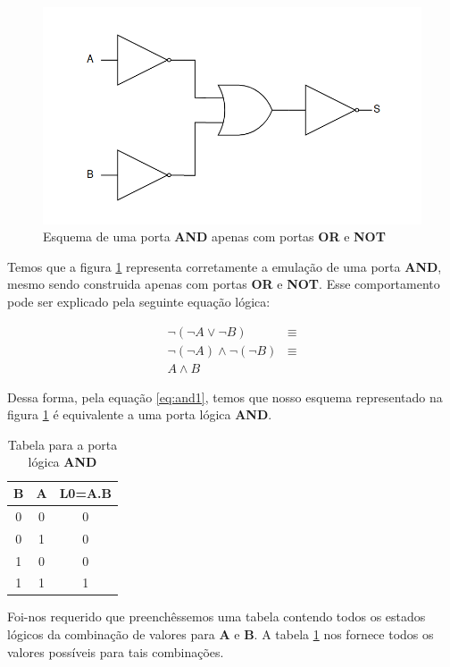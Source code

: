 \documentclass[12pt]{article}
\begin{document}
\begin{figure}[H]
    \centering
    \includegraphics[width=.9\textwidth]{exp1_2.3_f1.png}
    \caption{Esquema de uma porta \textbf{AND} apenas com portas \textbf{OR} e \textbf{NOT}}
    \label{fig:exp1_2.3_f1}
\end{figure}

Temos que a figura \ref{fig:exp1_2.3_f1} representa corretamente a emulação de
uma porta \textbf{AND}, mesmo sendo construida apenas com portas \textbf{OR} e
\textbf{NOT}. Esse comportamento pode ser explicado pela seguinte equação
lógica:

\begin{align}
\lnot (\lnot A \lor \lnot B) &\equiv \\
\lnot (\lnot A) \land \lnot (\lnot B) &\equiv \\
A \land B \label{eq:and1}
\end{align}

Dessa forma, pela equação \ref{eq:and1}, temos que nosso esquema representado na figura
\ref{fig:exp1_2.3_f1} é equivalente a uma porta lógica \textbf{AND}.

\begin{table}[H]
    \centering
    \caption{Tabela para a porta lógica \textbf{AND}}
    \begin{tabular}{|c|c|c|}
    \hline
    \textbf{B} & \textbf{A} & \textbf{L0}=A.B \\
    \hline
    0 & 0 & 0 \\ \cline{1-3}
    0 & 1 & 0 \\ \cline{1-3}
    1 & 0 & 0 \\ \cline{1-3}
    1 & 1 & 1 \\ \hline
    \end{tabular}
    \label{tab:tabela_and}
\end{table}

Foi-nos requerido que preenchêssemos uma tabela contendo todos os estados
lógicos da combinação de valores para \textbf{A} e \textbf{B}. A tabela
\ref{tab:tabela_and} nos fornece todos os valores possíveis para tais
combinações.
\end{document}
